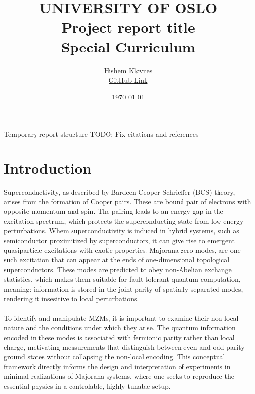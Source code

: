 \documentclass[11pt, letterpaper, titlepage]{article}
\title{
 \textbf{\LARGE UNIVERSITY OF OSLO} \\
\vspace{37mm}
\textbf{\Large Project report title}\\
\vspace{7mm}
\Large Special Curriculum \\
\vspace{25mm}
}
\author{\Large Hishem Kløvnes \\ \textcolor{blue}{\href{https://github.com/hishemok/Special_curriculum}{GitHub Link} }}
\date{\Large \today} %
\begin{document}
\maketitle
\newpage



\Large Temporary report structure
\Large TODO: Fix citations and references
\section{Introduction}
Superconductivity, as described by Bardeen-Cooper-Schrieffer (BCS) theory, arises from the formation of Cooper pairs. These are bound pair of electrons with opposite momentum and spin. The pairing leads to an energy gap in the excitation spectrum, which protects the superconducting state from low-energy perturbations. Whem superconductivity is induced in hybrid systems, such as semiconductor proximitized by superconductors, it can give rise to emergent quasiparticle excitations with exotic properties. Majorana zero modes, are one such excitation that can appear at the ends of one-dimensional topological superconductors. These modes are predicted to obey non-Abelian exchange statistics, which makes them suitable for fault-tolerant quantum computation, meaning: information is stored in the joint parity of spatially separated modes, rendering it insesitive to local perturbations.\\ \\
To identify and manipulate MZMs, it is important to examine their non-local nature and the conditions under which they arise. The quantum information encoded in these modes is associated with fermionic parity rather than local charge, motivating measurements that distinguish between even and odd parity ground states without collapsing the non-local encoding. This conceptual framework directly informs the design and interpretation of experiments in minimal realizations of Majorana systems, where one seeks to reproduce the essential physics in a controlable, highly tunable setup. \\ \\
\end{document}
